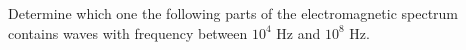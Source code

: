 Determine which one the following parts of the electromagnetic spectrum contains 
waves with frequency between $10^4$ Hz
and $10^8$ Hz.